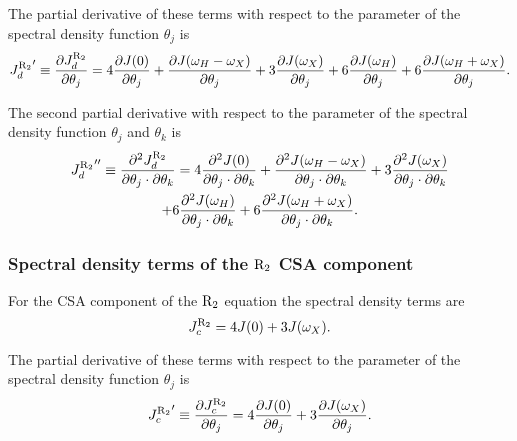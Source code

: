\noindent The partial derivative of these terms with respect to the parameter of the spectral density function $\theta_j$ is
\begin{equation}
    {J_d^{\mathrm{R}_2}}' \equiv \frac{\partial J_d^{\mathrm{R}_2}}{\partial \theta_j}
        = 4 \frac{\partial J(0)}{\partial \theta_j}
        + \frac{\partial J(\omega_H - \omega_X)}{\partial \theta_j}
        + 3 \frac{\partial J(\omega_X)}{\partial \theta_j}
        + 6 \frac{\partial J(\omega_H)}{\partial \theta_j}
        + 6 \frac{\partial J(\omega_H + \omega_X)}{\partial \theta_j}.  \label{eq: J terms: JR2d'}
\end{equation}

\noindent The second partial derivative with respect to the parameter of the spectral density function $\theta_j$ and $\theta_k$ is
\begin{multline}
    {J_d^{\mathrm{R}_2}}'' \equiv \frac{\partial^2 J_d^{\mathrm{R}_2}}{\partial \theta_j \cdot \partial \theta_k}
        = 4 \frac{\partial^2 J(0)}{\partial \theta_j \cdot \partial \theta_k}
        + \frac{\partial^2 J(\omega_H - \omega_X)}{\partial \theta_j \cdot \partial \theta_k}
        + 3 \frac{\partial^2 J(\omega_X)}{\partial \theta_j \cdot \partial \theta_k} \\
        + 6 \frac{\partial^2 J(\omega_H)}{\partial \theta_j \cdot \partial \theta_k}
        + 6 \frac{\partial^2 J(\omega_H + \omega_X)}{\partial \theta_j \cdot \partial \theta_k}.  \label{eq: J terms: JR2d"}
\end{multline}


\subsubsection{Spectral density terms of the $\mathrm{R}_2$ CSA component}

For the CSA component of the $\mathrm{R}_2$ equation the spectral density terms are
\begin{equation}
    J_c^{\mathrm{R}_2} = 4J(0) + 3J(\omega_X).  \label{eq: J terms: JR2c}
\end{equation}

\noindent The partial derivative of these terms with respect to the parameter of the spectral density function $\theta_j$ is
\begin{equation}
    {J_c^{\mathrm{R}_2}}' \equiv \frac{\partial J_c^{\mathrm{R}_2}}{\partial \theta_j}
        = 4 \frac{\partial J(0)}{\partial \theta_j}
        + 3 \frac{\partial J(\omega_X)}{\partial \theta_j}.  \label{eq: J terms: JR2c'}
\end{equation}

